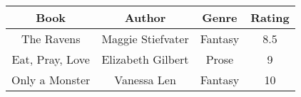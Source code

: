 \documentclass{article}
\begin{document}
\begin{table}[h!]
\centering
\begin{tabular}{|c|c|c|c|}
\hline
Book & Author & Genre & Rating \\
\hline
The Ravens & Maggie Stiefvater & Fantasy & 8.5 \\
\hline
Eat, Pray, Love & Elizabeth Gilbert & Prose & 9 \\
\hline
Only a Monster & Vanessa Len & Fantasy & 10 \\
\hline
\end{tabular}
\end{table}
\end{document}
